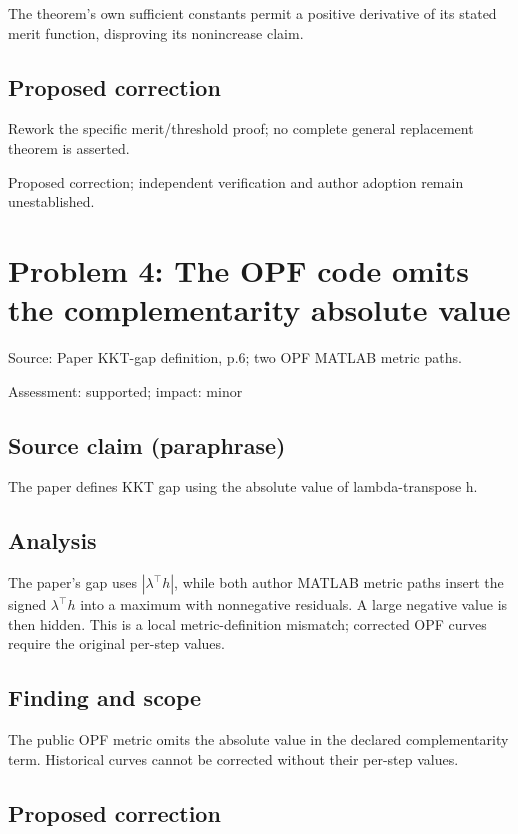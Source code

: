 \documentclass[11pt]{article}
\begin{document}
The theorem’s own sufficient constants permit a positive derivative of its stated merit function, disproving its nonincrease claim.

\subsection*{Proposed correction}

Rework the specific merit/threshold proof; no complete general replacement theorem is asserted.

Proposed correction; independent verification and author adoption remain unestablished.

\section*{Problem 4: The OPF code omits the complementarity absolute value}

Source: Paper KKT-gap definition, p.6; two OPF MATLAB metric paths.

Assessment: supported; impact: minor

\subsection*{Source claim (paraphrase)}

The paper defines KKT gap using the absolute value of lambda-transpose h.

\subsection*{Analysis}

The paper's gap uses \(|\lambda^\top h|\), while both author MATLAB metric paths insert the signed \(\lambda^\top h\) into a maximum with nonnegative residuals. A large negative value is then hidden. This is a local metric-definition mismatch; corrected OPF curves require the original per-step values.

\subsection*{Finding and scope}

The public OPF metric omits the absolute value in the declared complementarity term. Historical curves cannot be corrected without their per-step values.

\subsection*{Proposed correction}
\end{document}

